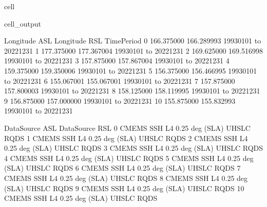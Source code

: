 \documentclass[letterpaper,10pt,english]{jupyterBook}
\begin{document}
\begin{sphinxuseclass}{cell}
\begin{sphinxVerbatimOutput}
\begin{sphinxuseclass}{cell_output}
\begin{sphinxVerbatim}[commandchars=\\\{\}]
    Longitude ASL  Longitude RSL               Time\PYGZus{}Period  \PYGZbs{}
0     \PYGZhy{}166.375000    \PYGZhy{}166.289993  1993\PYGZhy{}01\PYGZhy{}01 to 2022\PYGZhy{}12\PYGZhy{}31   
1     \PYGZhy{}177.375000    \PYGZhy{}177.367004  1993\PYGZhy{}01\PYGZhy{}01 to 2022\PYGZhy{}12\PYGZhy{}31   
2     \PYGZhy{}169.625000    \PYGZhy{}169.516998  1993\PYGZhy{}01\PYGZhy{}01 to 2022\PYGZhy{}12\PYGZhy{}31   
3     \PYGZhy{}157.875000    \PYGZhy{}157.867004  1993\PYGZhy{}01\PYGZhy{}01 to 2022\PYGZhy{}12\PYGZhy{}31   
4     \PYGZhy{}159.375000    \PYGZhy{}159.350006  1993\PYGZhy{}01\PYGZhy{}01 to 2022\PYGZhy{}12\PYGZhy{}31   
5     \PYGZhy{}156.375000    \PYGZhy{}156.466995  1993\PYGZhy{}01\PYGZhy{}01 to 2022\PYGZhy{}12\PYGZhy{}31   
6     \PYGZhy{}155.067001    \PYGZhy{}155.067001  1993\PYGZhy{}01\PYGZhy{}01 to 2022\PYGZhy{}12\PYGZhy{}31   
7     \PYGZhy{}157.875000    \PYGZhy{}157.800003  1993\PYGZhy{}01\PYGZhy{}01 to 2022\PYGZhy{}12\PYGZhy{}31   
8     \PYGZhy{}158.125000    \PYGZhy{}158.119995  1993\PYGZhy{}01\PYGZhy{}01 to 2022\PYGZhy{}12\PYGZhy{}31   
9     \PYGZhy{}156.875000    \PYGZhy{}157.000000  1993\PYGZhy{}01\PYGZhy{}01 to 2022\PYGZhy{}12\PYGZhy{}31   
10    \PYGZhy{}155.875000    \PYGZhy{}155.832993  1993\PYGZhy{}01\PYGZhy{}01 to 2022\PYGZhy{}12\PYGZhy{}31   

                Data\PYGZus{}Source ASL Data\PYGZus{}Source RSL  
0   CMEMS SSH L4 0.25 deg (SLA)      UHSLC RQDS  
1   CMEMS SSH L4 0.25 deg (SLA)      UHSLC RQDS  
2   CMEMS SSH L4 0.25 deg (SLA)      UHSLC RQDS  
3   CMEMS SSH L4 0.25 deg (SLA)      UHSLC RQDS  
4   CMEMS SSH L4 0.25 deg (SLA)      UHSLC RQDS  
5   CMEMS SSH L4 0.25 deg (SLA)      UHSLC RQDS  
6   CMEMS SSH L4 0.25 deg (SLA)      UHSLC RQDS  
7   CMEMS SSH L4 0.25 deg (SLA)      UHSLC RQDS  
8   CMEMS SSH L4 0.25 deg (SLA)      UHSLC RQDS  
9   CMEMS SSH L4 0.25 deg (SLA)      UHSLC RQDS  
10  CMEMS SSH L4 0.25 deg (SLA)      UHSLC RQDS  
\end{sphinxVerbatim}

\end{sphinxuseclass}\end{sphinxVerbatimOutput}

\end{sphinxuseclass}
\end{document}
